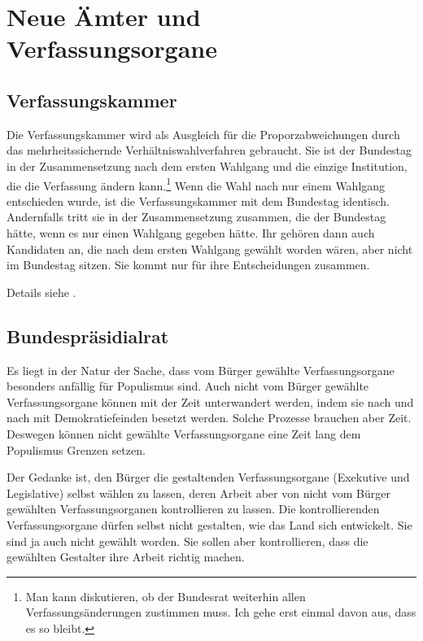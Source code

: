 \section{Neue Ämter und Verfassungsorgane}

\subsection{Verfassungskammer} \label{subsec:verfassungskammer}

Die Verfassungskammer wird als Ausgleich für die Proporzabweichungen durch das mehrheitssichernde Verhältniswahlverfahren gebraucht.
Sie ist der Bundestag in der Zusammensetzung nach dem ersten Wahlgang und die einzige Institution, die die Verfassung ändern kann.\footnote{Man kann diskutieren, ob der Bundesrat weiterhin allen Verfassungsänderungen zustimmen muss. Ich gehe erst einmal davon aus, dass es so bleibt.}
Wenn die Wahl nach nur einem Wahlgang entschieden wurde, ist die Verfassungskammer mit dem Bundestag identisch.
Andernfalls tritt sie in der Zusammensetzung zusammen, die der Bundestag hätte, wenn es nur einen Wahlgang gegeben hätte.
Ihr gehören dann auch Kandidaten an, die nach dem ersten Wahlgang gewählt worden wären, aber nicht im Bundestag sitzen.
Sie kommt nur für ihre Entscheidungen zusammen.

Details siehe .

\subsection{Bundespräsidialrat} \label{subsec:bundespraesidialrat}

Es liegt in der Natur der Sache, dass vom Bürger gewählte Verfassungsorgane besonders anfällig für Populismus sind.
Auch nicht vom Bürger gewählte Verfassungsorgane können mit der Zeit unterwandert werden, indem sie nach und nach mit Demokratiefeinden besetzt werden.
Solche Prozesse brauchen aber Zeit.
Deswegen können nicht gewählte Verfassungsorgane eine Zeit lang dem Populismus Grenzen setzen.

Der Gedanke ist, den Bürger die gestaltenden Verfassungsorgane (Exekutive und Legislative) selbst wählen zu lassen,
deren Arbeit aber von nicht vom Bürger gewählten Verfassungsorganen kontrollieren zu lassen.
Die kontrollierenden Verfassungsorgane dürfen selbst nicht gestalten, wie das Land sich entwickelt.
Sie sind ja auch nicht gewählt worden.
Sie sollen aber kontrollieren, dass die gewählten Gestalter ihre Arbeit richtig machen.

